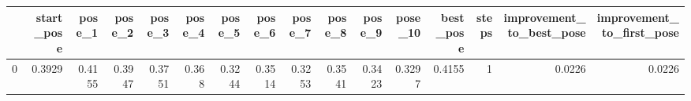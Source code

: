 \begin{tabular}{lrrrrrrrrrrrrrrr}
\toprule
{} &  start\_pose &  pose\_1 &  pose\_2 &  pose\_3 &  pose\_4 &  pose\_5 &  pose\_6 &  pose\_7 &  pose\_8 &  pose\_9 &  pose\_10 &  best\_pose &  steps &  improvement\_to\_best\_pose &  improvement\_to\_first\_pose \\
\midrule
0 &      0.3929 &  0.4155 &  0.3947 &  0.3751 &   0.368 &  0.3244 &  0.3514 &  0.3253 &  0.3541 &  0.3423 &   0.3297 &     0.4155 &      1 &                    0.0226 &                     0.0226 \\
\bottomrule
\end{tabular}
